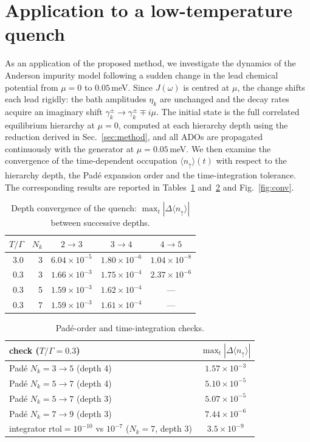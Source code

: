 \documentclass[11pt,a4paper]{article}
\begin{document}
\section{Application to a low-temperature quench}\label{sec:reference}

As an application of the proposed method, we investigate the dynamics of the
Anderson impurity model following a sudden change in the lead chemical potential
from $\mu = 0$ to $0.05$\,meV. Since $J(\omega)$ is centred at $\mu$, the change
shifts each lead rigidly: the bath amplitudes $\eta_k$ are unchanged and the
decay rates acquire an imaginary shift $\gamma^{\pm}_k \to \gamma^{\pm}_k
\mp i\mu$. The initial state is the full correlated equilibrium hierarchy at
$\mu = 0$, computed at each hierarchy depth using the reduction derived in
Sec.~\ref{sec:method}, and all ADOs are propagated continuously with the
generator at $\mu = 0.05$\,meV. We then examine the convergence of the time-dependent
occupation $\langle n_\uparrow\rangle(t)$ with respect to the hierarchy depth,
the Padé expansion order and the time-integration tolerance. The corresponding
results are reported in Tables~\ref{tab:depth} and~\ref{tab:pade} and
Fig.~\ref{fig:conv}.

\begin{table}[h]
\centering\small
\begin{tabular}{rrccc}
\toprule
$T/\Gamma$ & $N_k$ & $2\to3$ & $3\to4$ & $4\to5$\\
\midrule
3.0 & 3 & $6.04\times10^{-5}$ & $1.80\times10^{-6}$ & $1.04\times10^{-8}$\\
0.3 & 3 & $1.66\times10^{-3}$ & $1.75\times10^{-4}$ & $2.37\times10^{-6}$\\
0.3 & 5 & $1.59\times10^{-3}$ & $1.62\times10^{-4}$ & ---\\
0.3 & 7 & $1.59\times10^{-3}$ & $1.61\times10^{-4}$ & ---\\
\bottomrule
\end{tabular}
\caption{Depth convergence of the quench:
$\max_t|\Delta\langle n_\uparrow\rangle|$ between successive depths.}
\label{tab:depth}
\end{table}

\begin{table}[h]
\centering\small
\begin{tabular}{lc}
\toprule
check ($T/\Gamma = 0.3$) & $\max_t|\Delta\langle n_\uparrow\rangle|$\\
\midrule
Padé $N_k = 3\to5$ (depth 4) & $1.57\times10^{-3}$\\
Padé $N_k = 5\to7$ (depth 4) & $5.10\times10^{-5}$\\
Padé $N_k = 5\to7$ (depth 3) & $5.07\times10^{-5}$\\
Padé $N_k = 7\to9$ (depth 3) & $7.44\times10^{-6}$\\
integrator $\mathrm{rtol}=10^{-10}$ vs $10^{-7}$ ($N_k=7$, depth 3) & $3.5\times10^{-9}$\\
\bottomrule
\end{tabular}
\caption{Padé-order and time-integration checks.}
\label{tab:pade}
\end{table}
\end{document}
